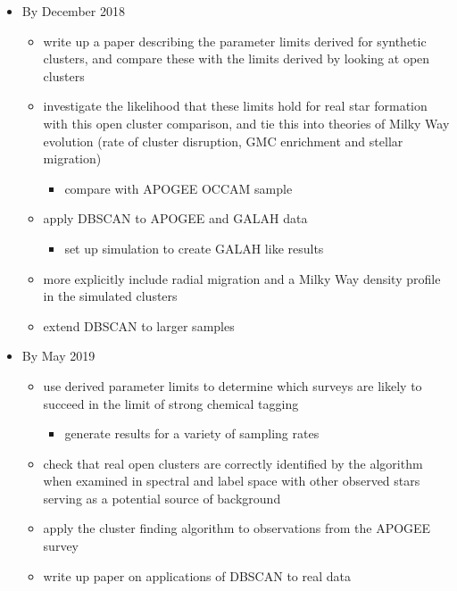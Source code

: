 \documentclass[11pt]{article}
\begin{document}
\begin{itemize}

\item By December 2018
\begin{itemize}
\item {\color{RoyalBlue} write up a paper describing the parameter limits derived for synthetic clusters, and compare these with the limits derived by looking at open clusters}
\item {\color{ForestGreen} investigate the likelihood that these limits hold for real star formation with this open cluster comparison, and tie this into theories of Milky Way evolution (rate of cluster disruption, GMC enrichment and stellar migration)}
\begin{itemize}
\item {\color{RoyalBlue} compare with APOGEE OCCAM sample}
\end{itemize}
\item {\color{ForestGreen} apply DBSCAN to APOGEE and GALAH data}
\begin{itemize}
\item set up simulation to create GALAH like results
\end{itemize}
\item {\color{RoyalBlue} more explicitly include radial migration and a Milky Way density profile in the simulated clusters}
\item {\color{ForestGreen} extend DBSCAN to larger samples}
\end{itemize}
\item By May 2019
\begin{itemize}
\item {\color{RoyalBlue} use derived parameter limits to determine which surveys are likely to succeed in the limit of strong chemical tagging}
	\begin{itemize}
		\item {\color{RoyalBlue} generate results for a variety of sampling rates}
	\end{itemize}
\item {\color{RoyalBlue} check that real open clusters are correctly identified by the algorithm when examined in spectral and label space with other observed stars serving as a potential source of background}
\item {\color{RoyalBlue} apply the cluster finding algorithm to observations from the APOGEE survey}
\item {\color{ForestGreen} write up paper on applications of DBSCAN to real data}

\end{itemize}
\end{itemize}
\end{document}
